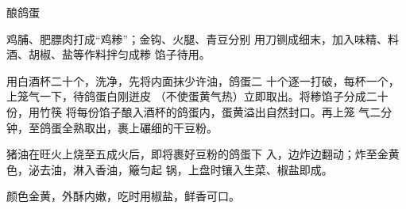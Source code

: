 \begin{recipe}{酿鸽蛋}

\ingredients


\cooking

\step 鸡脯、肥膘肉打成“鸡糁”；金钩、火腿、青豆分别 用刀铡成细末，加入味精、料酒、胡椒、盐等作料拌匀成糁 馅子待用。

用白酒杯二十个，洗净，先将内面抹少许油，鸽蛋二 十个逐一打破，每杯一个，上笼气一下，待鸽蛋白刚迸皮 （不使蛋黄气热）立即取出。将糁馅子分成二十份，用竹筷 将每份馅子酿入酒杯的鸽蛋内，蛋黄溢出自然封口。再上笼 气二分钟，至鸽蛋全熟取出，裹上碾细的干豆粉。

\step 猪油在旺火上烧至五成火后，即将裹好豆粉的鸽蛋下 入，边炸边翻动；炸至金黄色，泌去油，淋入香油，簸匀起 锅，上盘时镶入生菜、椒盐即成。

\notes

颜色金黄，外酥内嫩，吃时用椒盐，鲜香可口。

\end{recipe}

